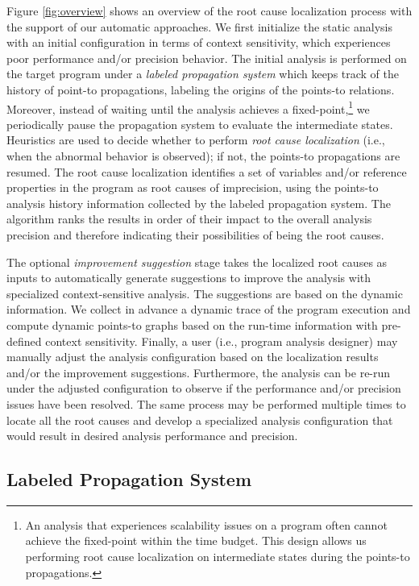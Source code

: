 Figure \ref{fig:overview} shows an overview of the root cause localization process with the support of our automatic approaches. We first initialize the static analysis with an initial configuration in terms of context sensitivity, which experiences poor performance and/or precision behavior. The initial analysis is performed on the target program under a {\it labeled propagation system} which keeps track of the history of point-to propagations, labeling the origins of the points-to relations. Moreover, instead of waiting until the analysis achieves a fixed-point,\footnote{An analysis that experiences scalability issues on a program often cannot achieve the fixed-point within the time budget. This design allows us performing root cause localization on intermediate states during the points-to propagations.} we periodically pause the propagation system to evaluate the intermediate states. Heuristics are used to decide whether to perform {\it root cause localization} (i.e., when the abnormal behavior is observed); if not, the points-to propagations are resumed. The root cause localization identifies a set of variables and/or reference properties in the program as root causes of imprecision, using the points-to analysis history information collected by the labeled propagation system. The algorithm ranks the results in order of their impact to the overall analysis precision and therefore indicating their possibilities of being the root causes.

The optional {\it improvement suggestion} stage takes the localized root causes as inputs to automatically generate suggestions to improve the analysis with specialized context-sensitive analysis. The suggestions are based on the dynamic information. We collect in advance a dynamic trace of the program execution and compute dynamic points-to graphs based on the run-time information with pre-defined context sensitivity. Finally, a user (i.e., program analysis designer) may manually adjust the analysis configuration based on the localization results and/or the improvement suggestions. Furthermore, the analysis can be re-run under the adjusted configuration to observe if the performance and/or precision issues have been resolved. The same process may be performed multiple times to locate all the root causes and develop a specialized analysis configuration that would result in desired analysis performance and precision.

\subsection{Labeled Propagation System}

